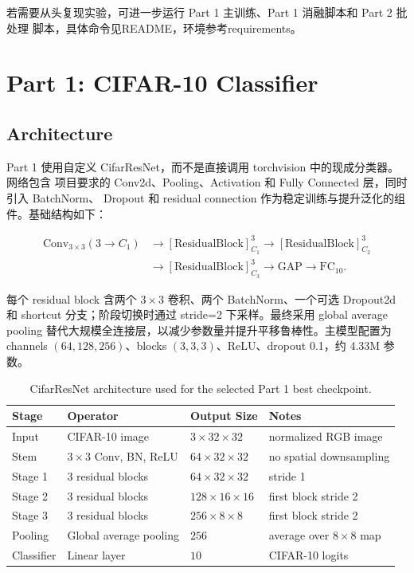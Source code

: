 \documentclass[11pt,a4paper]{ctexart}
\begin{document}
若需要从头复现实验，可进一步运行 Part 1 主训练、Part 1 消融脚本和 Part 2 批处理
脚本，具体命令见README，环境参考requirements。

\section{Part 1: CIFAR-10 Classifier}

\subsection{Architecture}

Part 1 使用自定义 CifarResNet，而不是直接调用 torchvision 中的现成分类器。网络包含
项目要求的 Conv2d、Pooling、Activation 和 Fully Connected 层，同时引入 BatchNorm、
Dropout 和 residual connection 作为稳定训练与提升泛化的组件。基础结构如下：

\[
\begin{aligned}
\mathrm{Conv}_{3\times3}(3 \rightarrow C_1)
&\rightarrow
\left[\mathrm{ResidualBlock}\right]^{3}_{C_1}
\rightarrow
\left[\mathrm{ResidualBlock}\right]^{3}_{C_2} \\
&\rightarrow
\left[\mathrm{ResidualBlock}\right]^{3}_{C_3}
\rightarrow
\mathrm{GAP}
\rightarrow
\mathrm{FC}_{10}.
\end{aligned}
\]

每个 residual block 含两个 $3\times3$ 卷积、两个 BatchNorm、一个可选 Dropout2d 和
shortcut 分支；阶段切换时通过 stride=2 下采样。最终采用 global average pooling
替代大规模全连接层，以减少参数量并提升平移鲁棒性。主模型配置为 channels
$(64,128,256)$、blocks $(3,3,3)$、ReLU、dropout 0.1，约 4.33M 参数。

\begin{table}[H]
\centering
\caption{CifarResNet architecture used for the selected Part 1 best checkpoint.}
\begin{tabular}{llll}
\toprule
Stage & Operator & Output Size & Notes \\
\midrule
Input & CIFAR-10 image & $3\times32\times32$ & normalized RGB image \\
Stem & $3\times3$ Conv, BN, ReLU & $64\times32\times32$ & no spatial downsampling \\
Stage 1 & 3 residual blocks & $64\times32\times32$ & stride 1 \\
Stage 2 & 3 residual blocks & $128\times16\times16$ & first block stride 2 \\
Stage 3 & 3 residual blocks & $256\times8\times8$ & first block stride 2 \\
Pooling & Global average pooling & $256$ & average over $8\times8$ map \\
Classifier & Linear layer & $10$ & CIFAR-10 logits \\
\bottomrule
\end{tabular}
\end{table}
\end{document}

